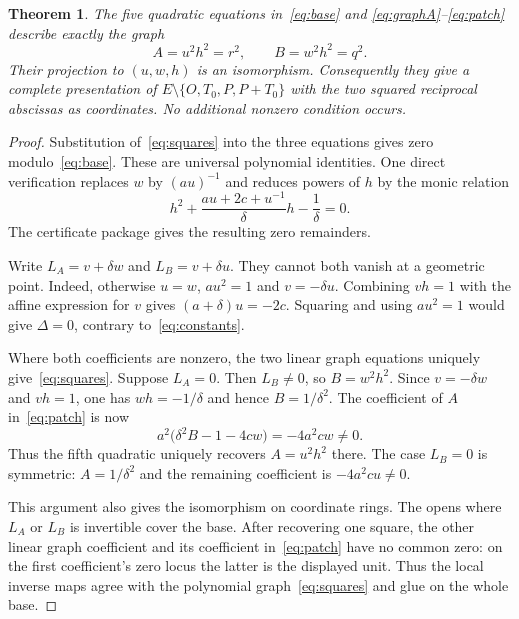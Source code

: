\documentclass[11pt,a4paper]{article}
\newtheorem{theorem}{Theorem}[section]
\begin{document}
\begin{theorem}\label{thm:graph}
The five quadratic equations in~\eqref{eq:base} and
\eqref{eq:graphA}--\eqref{eq:patch} describe exactly the graph
\begin{equation}\label{eq:squares}
                         A=u^2h^2=r^2,\qquad B=w^2h^2=q^2.
\end{equation}
Their projection to $(u,w,h)$ is an isomorphism. Consequently they
give a complete presentation of
$E\setminus\{O,T_0,P,P+T_0\}$ with the two squared reciprocal
abscissas as coordinates. No additional nonzero condition occurs.
\end{theorem}
\begin{proof}
Substitution of~\eqref{eq:squares} into the three equations gives
zero modulo~\eqref{eq:base}. These are universal polynomial
identities. One direct verification replaces $w$ by $(au)^{-1}$
and reduces powers of $h$ by the monic relation
\begin{equation}\label{eq:normal}
 h^2+\frac{au+2c+u^{-1}}{\delta}h-\frac1\delta=0.
\end{equation}
The certificate package gives the resulting zero remainders.

Write $L_A=v+\delta w$ and $L_B=v+\delta u$.
They cannot both vanish at a geometric point. Indeed, otherwise
$u=w$, $au^2=1$ and $v=-\delta u$. Combining $vh=1$ with
the affine expression for $v$ gives
$(a+\delta)u=-2c$. Squaring and using $au^2=1$ would give
$\Delta=0$, contrary to~\eqref{eq:constants}.

Where both coefficients are nonzero, the two linear graph equations
uniquely give~\eqref{eq:squares}. Suppose $L_A=0$.
Then $L_B\ne0$, so $B=w^2h^2$. Since $v=-\delta w$ and
$vh=1$, one has $wh=-1/\delta$ and hence $B=1/\delta^2$.
The coefficient of $A$ in~\eqref{eq:patch} is now
\[
 a^2\bigl(\delta^2B-1-4cw\bigr)=-4a^2cw\ne0.
\]
Thus the fifth quadratic uniquely recovers $A=u^2h^2$ there.
The case $L_B=0$ is symmetric: $A=1/\delta^2$ and the
remaining coefficient is $-4a^2cu\ne0$.

This argument also gives the isomorphism on coordinate rings.
The opens where $L_A$ or $L_B$ is invertible cover the base.
After recovering one square, the other linear graph coefficient
and its coefficient in~\eqref{eq:patch} have no common zero:
on the first coefficient's zero locus the latter is the displayed
unit. Thus the local inverse maps agree with the polynomial
graph~\eqref{eq:squares} and glue on the whole base.
\end{proof}
\end{document}
